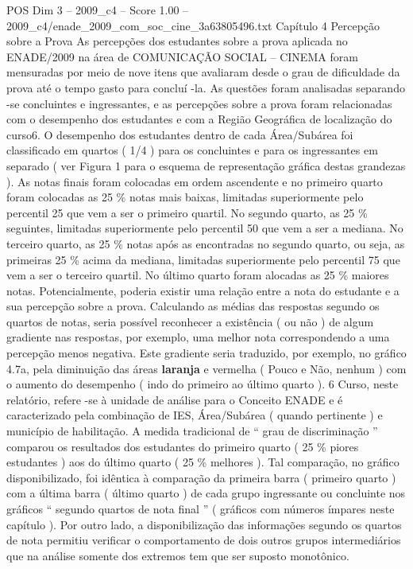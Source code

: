 \begin{textsample}{POS Dim 3 – 2009\_c4 – Score 1.00 – 2009\_c4/enade\_2009\_com\_soc\_cine\_3a63805496.txt}  \label{ex:f3_pos_126}
Capítulo 4 Percepção sobre a Prova As percepções dos estudantes sobre a prova aplicada no ENADE/2009 na área de COMUNICAÇÃO SOCIAL – CINEMA foram mensuradas por meio de nove itens que avaliaram desde o grau de dificuldade da prova até o tempo gasto para concluí -la.
As questões foram analisadas separando -se concluintes e ingressantes, e as percepções sobre a prova foram relacionadas com o desempenho dos estudantes e com a Região Geográfica de localização do curso6.
O desempenho dos estudantes dentro de cada Área/Subárea foi classificado em quartos ( 1/4 ) para os concluintes e para os ingressantes em separado ( ver Figura 1 para o esquema de representação gráfica destas grandezas ).
As notas finais foram colocadas em ordem ascendente e no primeiro quarto foram colocadas as 25 \% notas mais baixas, limitadas superiormente pelo percentil 25 que vem a ser o primeiro quartil.
No segundo quarto, as 25 \% seguintes, limitadas superiormente pelo percentil 50 que vem a ser a mediana.
No terceiro quarto, as 25 \% notas após as encontradas no segundo quarto, ou seja, as primeiras 25 \% acima da mediana, limitadas superiormente pelo percentil 75 que vem a ser o terceiro quartil.
No último quarto foram alocadas as 25 \% maiores notas.
Potencialmente, poderia existir uma relação entre a nota do estudante e a sua percepção sobre a prova.
Calculando as médias das respostas segundo os quartos de notas, seria possível reconhecer a existência ( ou não ) de algum gradiente nas respostas, por exemplo, uma melhor nota correspondendo a uma percepção menos negativa.
Este gradiente seria traduzido, por exemplo, no gráfico 4.7a, pela diminuição das áreas \textbf{laranja} e vermelha ( Pouco e Não, nenhum ) com o aumento do desempenho ( indo do primeiro ao último quarto ). 6 Curso, neste relatório, refere -se à unidade de análise para o Conceito ENADE e é caracterizado pela combinação de IES, Área/Subárea ( quando pertinente ) e município de habilitação.
A medida tradicional de “ grau de discriminação ” comparou os resultados dos estudantes do primeiro quarto ( 25 \% piores estudantes ) aos do último quarto ( 25 \% melhores ).
Tal comparação, no gráfico disponibilizado, foi idêntica à comparação da primeira barra ( primeiro quarto ) com a última barra ( último quarto ) de cada grupo ingressante ou concluinte nos gráficos “ segundo quartos de nota final ” ( gráficos com números ímpares neste capítulo ).
Por outro lado, a disponibilização das informações segundo os quartos de nota permitiu verificar o comportamento de dois outros grupos intermediários que na análise somente dos extremos tem que ser suposto monotônico.

\end{textsample}

